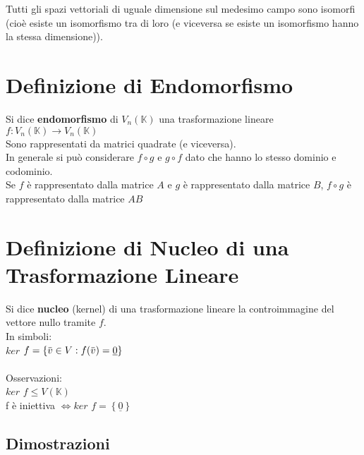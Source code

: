 \documentclass[a4paper, twoside, italian, 11pt]{book}
\newcommand{\braces}[1] {\left \{ #1 \right \}}
\newcommand{\overbar}[1] {\mkern 1.5mu\overline{\mkern-1.5mu#1\mkern-1.5mu}\mkern 1.5mu}
\newcommand{\K}{\mathbb K}
\begin{document}
\noindent
Tutti gli spazi vettoriali di uguale dimensione sul medesimo campo sono isomorfi (cioè esiste un isomorfismo tra di loro (e viceversa se esiste un isomorfismo hanno la stessa dimensione)).



\section{Definizione di Endomorfismo}

Si dice \textbf{endomorfismo} di $V_n(\K)$ una trasformazione lineare $f : V_n(\K) \rightarrow V_n(\K)$ \\

\noindent
Sono rappresentati da matrici quadrate (e viceversa). \\

\noindent
In generale si può considerare $f \circ g$ e $g \circ f$ dato che hanno lo stesso dominio e codominio. \\

\noindent
Se $f$ è rappresentato dalla matrice $A$ e $g$ è rappresentato dalla matrice $B$, $f \circ g$ è rappresentato dalla matrice $AB$



\section{Definizione di Nucleo di una Trasformazione Lineare}

Si dice \textbf{nucleo} (kernel) di una trasformazione lineare la controimmagine del vettore nullo tramite $f$. \\

\noindent
In simboli: \\

$ker$ $f = \braces{\overbar v \in V : f(\overbar v) = \underline 0}$ \\\\

\noindent
Osservazioni: \\

$ker$ $f \leq V(\K)$ \\

f è iniettiva $\iff ker$ $f = \braces{\underline 0}$


\subsection{Dimostrazioni}

\end{document}
